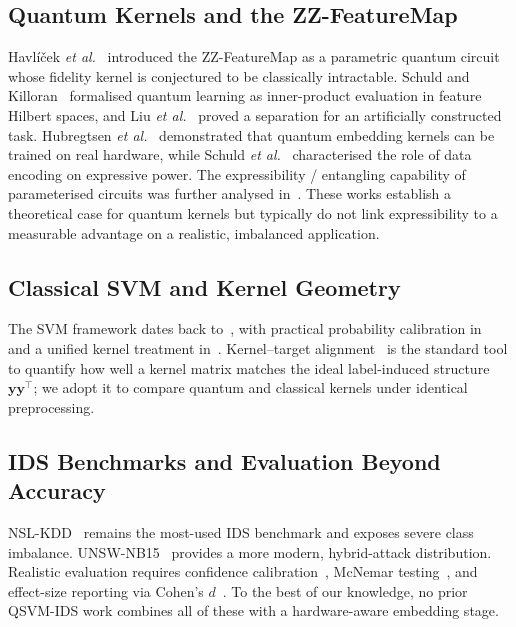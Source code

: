 \documentclass[journal]{IEEEtran}
\newcommand{\ZZ}{\textsc{ZZ}}
\begin{document}
  \subsection{Quantum Kernels and the \ZZ{}-FeatureMap}
  Havlí\v{c}ek \emph{et al.}~\cite{havlicek2019} introduced the
  \ZZ{}-FeatureMap as a parametric quantum circuit whose fidelity kernel
  is conjectured to be classically intractable. Schuld and
  Killoran~\cite{schuld2019hilbert} formalised quantum learning as
  inner-product evaluation in feature Hilbert spaces, and Liu
  \emph{et al.}~\cite{liu2021speedup} proved a separation for an
  artificially constructed task. Hubregtsen
  \emph{et al.}~\cite{hubregtsen2022training} demonstrated that quantum
  embedding kernels can be trained on real hardware, while
  Schuld \emph{et al.}~\cite{schuld2021effect} characterised the role
  of data encoding on expressive power. The expressibility / entangling
  capability of parameterised circuits was further analysed
  in~\cite{bardet2024prxq}. These works establish a theoretical case
  for quantum kernels but typically do not link expressibility to a
  measurable advantage on a realistic, imbalanced application.

  \subsection{Classical SVM and Kernel Geometry}
  The SVM framework dates back to~\cite{vapnik2000statistical,
  cortes1995svm}, with practical probability calibration
  in~\cite{platt1999svm} and a unified kernel treatment
  in~\cite{scholkopf2002learning}. Kernel--target
  alignment~\cite{cristianini2002kta,cortes2012alignment} is the
  standard tool to quantify how well a kernel matrix matches the ideal
  label-induced structure $\mathbf{y}\mathbf{y}^{\top}$; we adopt it
  to compare quantum and classical kernels under identical
  preprocessing.

  \subsection{IDS Benchmarks and Evaluation Beyond Accuracy}
  NSL-KDD~\cite{tavallaee2009nslkdd} remains the most-used IDS
  benchmark and exposes severe class
  imbalance. UNSW-NB15~\cite{moustafa2015unsw} provides a more modern,
  hybrid-attack distribution. Realistic evaluation requires confidence
  calibration~\cite{guo2017calibration,kull2017beta,niculescu2005pred},
  McNemar testing~\cite{mcnemar1947note,dietterich1998approximate}, and
  effect-size reporting via Cohen's $d$~\cite{cohen1988statistical}. To
  the best of our knowledge, no prior QSVM-IDS work combines all of
  these with a hardware-aware embedding stage.
\end{document}
